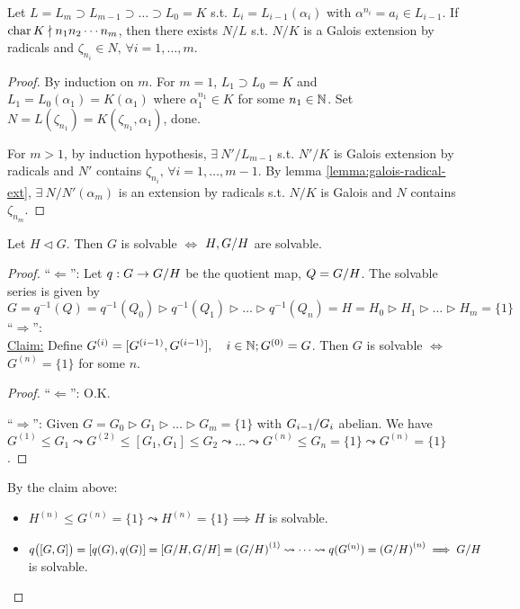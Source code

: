 \begin{lemma} \label{lemma:radical-ext-chain-galois}
  Let $L = L_m \supset L_{m-1} \supset \dots \supset L_0 = K$ s.t.
  $L_i = L_{i-1}(\alpha_i)$ with $\alpha^{n_i} = a_i \in L_{i-1}$.
  If $\operatorname{char} K \nmid n_1n_2\cdots n_m$, then there exists $N/L$ s.t.
  $N/K$ is a Galois extension by radicals and $\zeta_{n_i} \in N, \,
  \forall i = 1, \dots, m$.

  \begin{proof}
    By induction on $m$. For $m = 1$, $L_1 \supset L_0 = K$ and
    $L_1 = L_0(\alpha_1) = K(\alpha_1)$ where $\alpha_1^{n_1} \in K$ for some
    $n_1\in \mathbb{N}$. Set $N = L(\zeta_{n_1}) = K(\zeta_{n_1}, \alpha_1)$, done.

    For $m > 1$, by induction hypothesis, $\exists\: N'/L_{m-1}$ s.t.
    $N'/K$ is Galois extension by radicals and $N'$ contains
    $\zeta_{n_i},\, \forall i = 1, \dots, m-1$.
    By lemma \ref{lemma:galois-radical-ext}, $\exists\: N/N'(\alpha_m)$ is
    an extension by radicals s.t. $N/K$ is Galois and $N$ contains $\zeta_{n_m}$.
  \end{proof}
\end{lemma}

\begin{prop} \label{prop:quot-solvable}
  Let $H \lhd G$. Then $G$ is solvable $\iff$ $H, {G}/{H}$ are solvable.

  \begin{proof}
    ``$\Leftarrow$'': Let $q: G \to {G}/{H}$ be the quotient map,
    $Q = {G}/{H}$. The solvable series is given by
    \[
      G = q^{-1}(Q) = q^{-1}(Q_0) \rhd q^{-1}(Q_1) \rhd \dots \rhd q^{-1}(Q_n)
      = H = H_0 \rhd H_1 \rhd \dots \rhd H_m = \{ 1 \}
    \]
    ``$\Rightarrow$'': \\
    \underline{Claim:} Define $G^{(i)} = [G^{(i-1)}, G^{(i-1)}], \quad
    i \in \mathbb{N}; G^{(0)} = G$.
    Then $G$ is solvable $\iff$ $G^{(n)} = \{1 \}$ for some $n$.
    \begin{proof}
      ``$\Leftarrow$'': O.K.

      ``$\Rightarrow$'': Given $G = G_0 \rhd G_1 \rhd \dots \rhd G_m = \{1\}$
      with ${G_{i-1}}/{G_i}$ abelian.
      We have $G^{(1)} \le G_1 \leadsto G^{(2)} \le [G_1, G_1] \le G_2 \leadsto
      \dots \leadsto G^{(n)} \le G_n = \{ 1 \} \leadsto G^{(n)} = \{1\}$.
    \end{proof}
    By the claim above:
    \begin{itemize}
      \item $H^{(n)} \le G^{(n)} = \{1\} \leadsto H^{(n)} = \{1\} \implies H$ 
        is solvable.
      \item $q\big([G, G]\big) = [q(G), q(G)] = [{G}/{H}, {G}/{H}] =
        \left({G}/{H}\right)^{(1)} \leadsto \dots \leadsto
        q(G^{(n)}) = \left({G}/{H}\right)^{(n)} \implies {G}/{H}$
        is solvable.
    \end{itemize}
  \end{proof}
\end{prop}

